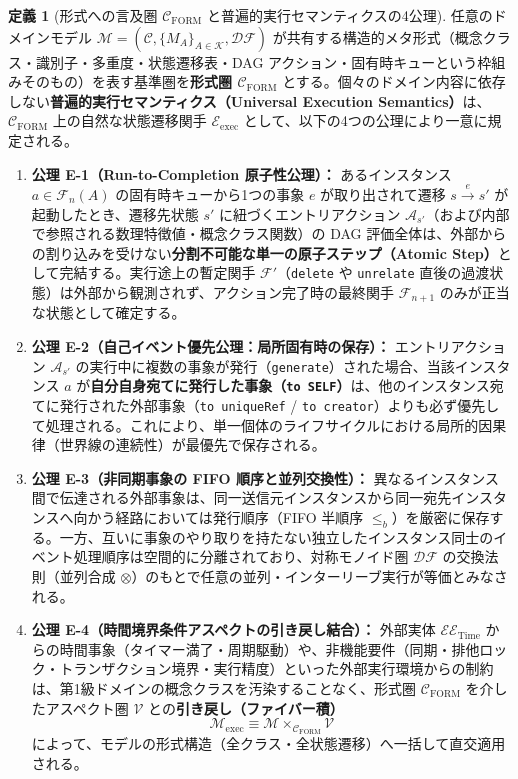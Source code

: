 \documentclass[11pt,a4paper]{ltjsarticle}
\theoremstyle{definition}
\newtheorem{definition}{定義}[section]
\theoremstyle{plain}
\theoremstyle{remark}
\newcommand{\DF}{\mathcal{DF}}
\newcommand{\Cform}{\mathcal{C}_{\mathrm{FORM}}}
\begin{document}
\begin{definition}[形式への言及圏 $\Cform$ と普遍的実行セマンティクスの4公理]\label{def:exec-sem}
任意のドメインモデル $\mathcal{M} = (\mathcal{C}, \{M_A\}_{A \in \mathcal{K}}, \DF)$ が共有する構造的メタ形式（概念クラス・識別子・多重度・状態遷移表・DAG アクション・固有時キューという枠組みそのもの）を表す基準圏を\textbf{形式圏 $\Cform$} とする。個々のドメイン内容に依存しない\textbf{普遍的実行セマンティクス（Universal Execution Semantics）}は、$\Cform$ 上の自然な状態遷移関手 $\mathcal{E}_{\mathrm{exec}}$ として、以下の4つの公理により一意に規定される。
\begin{enumerate}
    \item \textbf{公理 E-1（Run-to-Completion 原子性公理）：}
    あるインスタンス $a \in \mathcal{F}_n(A)$ の固有時キューから1つの事象 $e$ が取り出されて遷移 $s \xrightarrow{e} s'$ が起動したとき、遷移先状態 $s'$ に紐づくエントリアクション $\mathcal{A}_{s'}$（および内部で参照される数理特徴値・概念クラス関数）の DAG 評価全体は、外部からの割り込みを受けない\textbf{分割不可能な単一の原子ステップ（Atomic Step）}として完結する。実行途上の暫定関手 $\mathcal{F}'$（\texttt{delete} や \texttt{unrelate} 直後の過渡状態）は外部から観測されず、アクション完了時の最終関手 $\mathcal{F}_{n+1}$ のみが正当な状態として確定する。
    \item \textbf{公理 E-2（自己イベント優先公理：局所固有時の保存）：}
    エントリアクション $\mathcal{A}_{s'}$ の実行中に複数の事象が発行（\texttt{generate}）された場合、当該インスタンス $a$ が\textbf{自分自身宛てに発行した事象（\texttt{to SELF}）}は、他のインスタンス宛てに発行された外部事象（\texttt{to uniqueRef} / \texttt{to creator}）よりも必ず優先して処理される。これにより、単一個体のライフサイクルにおける局所的因果律（世界線の連続性）が最優先で保存される。
    \item \textbf{公理 E-3（非同期事象の FIFO 順序と並列交換性）：}
    異なるインスタンス間で伝達される外部事象は、同一送信元インスタンスから同一宛先インスタンスへ向かう経路においては発行順序（FIFO 半順序 $\le_b$）を厳密に保存する。一方、互いに事象のやり取りを持たない独立したインスタンス同士のイベント処理順序は空間的に分離されており、対称モノイド圏 $\DF$ の交換法則（並列合成 $\otimes$）のもとで任意の並列・インターリーブ実行が等価とみなされる。
    \item \textbf{公理 E-4（時間境界条件アスペクトの引き戻し結合）：}
    外部実体 $\mathcal{EE}_{\mathrm{Time}}$ からの時間事象（タイマー満了・周期駆動）や、非機能要件（同期・排他ロック・トランザクション境界・実行精度）といった外部実行環境からの制約は、第1級ドメインの概念クラスを汚染することなく、形式圏 $\Cform$ を介したアスペクト圏 $\mathcal{V}$ との\textbf{引き戻し（ファイバー積）}
    \begin{equation}
    \mathcal{M}_{\mathrm{exec}} \equiv \mathcal{M} \times_{\Cform} \mathcal{V}
    \end{equation}
    によって、モデルの形式構造（全クラス・全状態遷移）へ一括して直交適用される。
\end{enumerate}
\end{definition}
\end{document}
